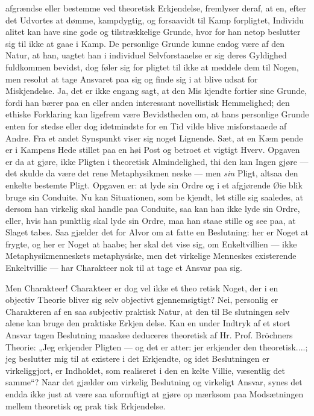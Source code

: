 \documentclass[12pt]{book}
\newcommand{\opage}[1]{\marginnote{\footnotesize\textit{[#1]}}}
\begin{document}
afgrændse eller bestemme ved theoretisk Erkjendelse,
fremlyser deraf, at en, efter det Udvortes at dømme,
kampdygtig, og forsaavidt til Kamp forpligtet, Individu\-%
alitet kan have sine gode og tilstrækkelige Grunde, hvor\-%
for han netop beslutter sig til ikke at gaae i Kamp.
De personlige Grunde kunne endog være af den Natur,
at han, uagtet han i individuel Selvforstaaelse er sig
deres Gyldighed fuldkommen bevidst, dog føler sig for\-%
pligtet til ikke at meddele dem til Nogen, men resolut
at tage Ansvaret paa sig og finde sig i at blive udsat for
Miskjendelse. Ja, det er ikke engang sagt, at den Mis\-%
kjendte fortier sine Grunde, fordi han bærer paa en eller
anden interessant novellistisk Hemmelighed; den ethiske
Forklaring kan ligefrem være Bevidstheden om, at hans
personlige Grunde enten for stedse eller dog idetmindste
for en Tid vilde blive misforstaaede af Andre. Fra et
andet Synspunkt viser sig noget Lignende. Sæt, at en Kæm\-%
pende er i Kampens Hede stillet paa en høi Post og
betroet et vigtigt Hverv. Opgaven er da at gjøre, ikke
Pligten i theoretisk Almindelighed, thi den kan Ingen
gjøre --- det skulde da være det rene Metaphysikmen\-%
neske --- men \emph{sin} Pligt, altsaa den enkelte bestemte Pligt.
Opgaven er: at lyde sin Ordre og i et afgjørende Øie\-%
blik bruge sin Conduite. Nu kan Situationen, som be\-%
kjendt, let stille sig saaledes, at dersom han virkelig skal
handle paa Conduite, saa kan han ikke lyde sin Ordre, eller,
hvis han punktlig skal lyde sin Ordre, maa han staae
stille og see paa, at Slaget tabes. Saa gjælder det for
Alvor om at fatte en Beslutning: her er Noget at frygte,
og her er Noget at haabe; her skal det vise sig, om
Enkeltvillien --- ikke Metaphysikmenneskets metaphysiske,
men det virkelige Menneskes existerende Enkeltvillie ---
har Charakteer nok til at tage et Ansvar paa sig.

\opage{36}\setcounter{footnote}{0}%
Men Charakteer! Charakteer er dog vel ikke et theo\-%
retisk Noget, der i en objectiv Theorie bliver sig selv
objectivt gjennemsigtigt? Nei, personlig er Charakteren
af en saa subjectiv praktisk Natur, at den til Be\-%
slutningen selv alene kan bruge den praktiske Erkjen\-%
delse. Kan en under Indtryk af et stort Ansvar tagen
Beslutning maaskee deduceres theoretisk af Hr. Prof.
Bröchners Theorie: „Jeg erkjender Pligten --- og det
er atter: jer erkjender den theoretisk....; jeg beslutter
mig til at existere i det Erkjendte, og idet Beslutningen
er virkeliggjort, er Indholdet, som realiseret i den en\-%
kelte Villie, væsentlig det samme“? Naar det gjælder
om virkelig Beslutning og virkeligt Ansvar, synes det
endda ikke just at være saa ufornuftigt at gjøre op\-%
mærksom paa Modsætningen mellem theoretisk og prak\-%
tisk Erkjendelse.
\end{document}
